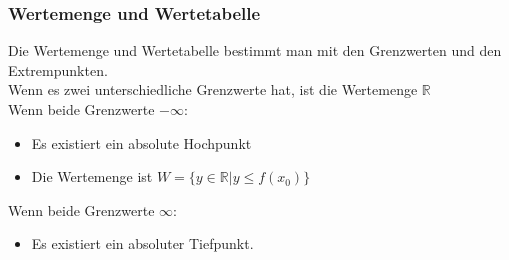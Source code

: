\documentclass{article}
\newcommand{\R}{\mathbb{R}}
\begin{document}
	\subsubsection{Wertemenge und Wertetabelle}
	Die Wertemenge und Wertetabelle bestimmt man mit den Grenzwerten und den Extrempunkten. \\
	Wenn es zwei unterschiedliche Grenzwerte hat, ist die Wertemenge $\R$ \\
	Wenn beide Grenzwerte $-\infty$:
	\begin{itemize}
		\item{Es existiert ein absolute Hochpunkt}
		\item{Die Wertemenge ist $W=\{y\in \R| y\leq f(x_0)\}$}
	\end{itemize}
	Wenn beide Grenzwerte $\infty$:
	\begin{itemize}
		\item{Es existiert ein absoluter Tiefpunkt.}
	\end{itemize}
\end{document}
